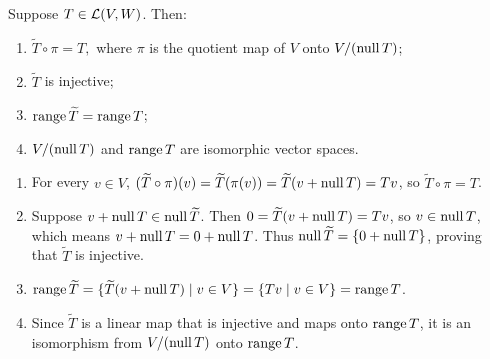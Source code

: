 \begin{thm}
  \label{thm: null space and range of T tilde}
  Suppose $T\in \mathcal{L}(V,W)$. Then:
  \begin{enumerate}[label=\textbf{(\alph*)}]
    \item $\widetilde{T} \circ \pi = T,$ where $\pi$ is the quotient map of $V$ onto $V/(\operatorname{null} T)$;
    \item $\widetilde{T}$ is injective;
    \item $\operatorname{range} \widetilde{T} = \operatorname{range} T$;
    \item $V/(\operatorname{null} T)$ and $\operatorname{range} T$ are isomorphic vector spaces.
  \end{enumerate}
\end{thm}
\begin{prf}
  \begin{enumerate}[label=\textbf{(\alph*)}]
    \item For every $v \in V$, $(\widetilde{T} \circ \pi)(v) = \widetilde{T}(\pi(v)) = \widetilde{T}(v + \operatorname{null} T) = Tv$, so $\widetilde{T} \circ \pi = T$.
    \item Suppose $v + \operatorname{null} T \in \operatorname{null} \widetilde{T}$. Then $0 = \widetilde{T}(v + \operatorname{null} T) = Tv$, so $v \in \operatorname{null} T$, which means $v + \operatorname{null} T = 0 + \operatorname{null} T$. Thus $\operatorname{null} \widetilde{T} = \{0 + \operatorname{null} T\}$, proving that $\widetilde{T}$ is injective.
    \item $\operatorname{range} \widetilde{T} = \{\widetilde{T}(v + \operatorname{null} T) \mid v \in V\} = \{Tv \mid v \in V\} = \operatorname{range} T$.
    \item Since $\widetilde{T}$ is a linear map that is injective and maps onto $\operatorname{range} T$, it is an isomorphism from $V/(\operatorname{null} T)$ onto $\operatorname{range} T$.
  \end{enumerate}
  \vspace{-\baselineskip}
\end{prf}